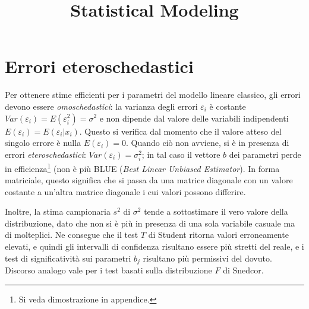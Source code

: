\documentclass[a4page, 11pt]{article} %
\title{Statistical Modeling}
\author{}
\date{}
\begin{document}
\maketitle
\tableofcontents %
\newpage

\section{Errori eteroschedastici}
Per ottenere stime efficienti per i parametri del modello lineare classico, gli errori devono essere \textit{omoschedastici}: la varianza degli errori $\varepsilon_i$ è costante $Var(\varepsilon_i) = E(\varepsilon_i^2) = \sigma^2$ e non dipende dal valore delle variabili indipendenti $E(\varepsilon_i) = E(\varepsilon_i | x_i)$.
Questo si verifica dal momento che il valore atteso del singolo errore è nulla $E(\varepsilon_i) = 0$.
Quando ciò non avviene, si è in presenza di errori \textit{eteroschedastici}: $Var(\varepsilon_i) = \sigma_i^2$; in tal caso il vettore $b$ dei parametri perde in efficienza\footnote{Si veda dimostrazione in appendice.} (non è più BLUE (\textit{Best Linear Unbiased Estimator}).
In forma matriciale, questo significa che si passa da una matrice diagonale con un valore costante a un'altra matrice diagonale i cui valori possono differire.

Inoltre, la stima campionaria $s^2$ di $\sigma^2$ tende a sottostimare il vero valore della distribuzione, dato che non si è più in presenza di una sola variabile casuale ma di molteplici.
Ne consegue che il test $T$ di Student ritorna valori erroneamente elevati, e quindi gli intervalli di confidenza risultano essere più stretti del reale, e i test di significatività sui parametri $b_j$ risultano più permissivi del dovuto.
Discorso analogo vale per i test basati sulla distribuzione $F$ di Snedcor.
\end{document}
